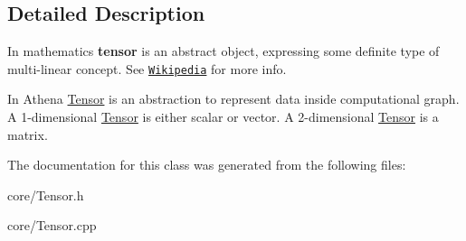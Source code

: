 \subsection{Detailed Description}
In mathematics {\bfseries tensor} is an abstract object, expressing some definite type of multi-\/linear concept. See \href{https://en.wikipedia.org/wiki/Tensor_(intrinsic_definition)}{\tt Wikipedia} for more info. 

In Athena \mbox{\hyperlink{classathena_1_1core_1_1_tensor}{Tensor}} is an abstraction to represent data inside computational graph. A 1-\/dimensional \mbox{\hyperlink{classathena_1_1core_1_1_tensor}{Tensor}} is either scalar or vector. A 2-\/dimensional \mbox{\hyperlink{classathena_1_1core_1_1_tensor}{Tensor}} is a matrix. 

The documentation for this class was generated from the following files\+:\begin{DoxyCompactItemize}
\item 
core/Tensor.\+h\item 
core/Tensor.\+cpp\end{DoxyCompactItemize}
